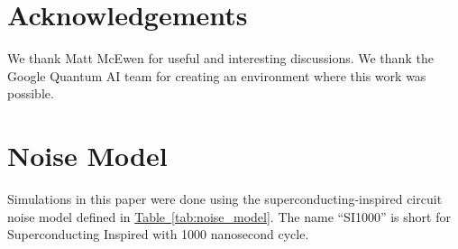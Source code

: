 \documentclass[onecolumn,unpublished,a4paper]{quantumarticle}
\theoremstyle{definition}
\theoremstyle{definition}
\theoremstyle{definition}
\newcommand{\tab}[1]{\hyperref[tab:#1]{Table~\ref*{tab:#1}}}
\begin{document}
\section{Acknowledgements}

We thank Matt McEwen for useful and interesting discussions.
We thank the Google Quantum AI team for creating an environment where this work was possible.

\printbibliography

\appendix
\clearpage
\section{Noise Model}
\label{app:noise}

Simulations in this paper were done using the superconducting-inspired circuit noise model defined in \tab{noise_model}.
The name ``SI1000'' is short for Superconducting Inspired with 1000 nanosecond cycle.
\end{document}
